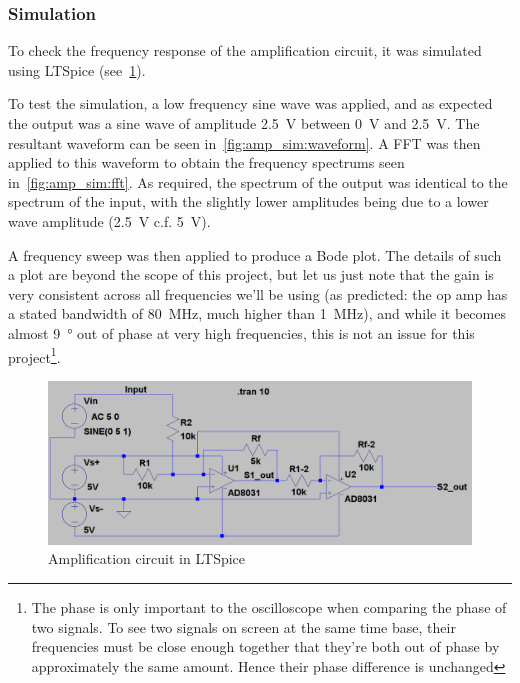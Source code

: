\subsubsection{Simulation}
To check the frequency response of the amplification circuit, it was simulated
using LTSpice (see~\cref{fig:amp_sim:circuit}).

To test the simulation, a low frequency sine wave was applied, and as expected
the output was a sine wave of amplitude \SI{2.5}{\volt} between \SI{0}{\volt}
and \SI{2.5}{\volt}. The resultant waveform can be seen
in~\cref{fig:amp_sim:waveform}. A FFT was then applied to this waveform to
obtain the frequency spectrums seen in~\cref{fig:amp_sim:fft}. As required, the
spectrum of the output was identical to the spectrum of the input, with the
slightly lower amplitudes being due to a lower wave amplitude (\SI{2.5}{\volt}
c.f. \SI{5}{\volt}).

A frequency sweep was then applied to produce a Bode plot. The details of such a
plot are beyond the scope of this project, but let us just note that the gain is
very consistent across all frequencies we'll be using (as predicted: the op amp
has a stated bandwidth of \SI{80}{\MHz}, much higher than \SI{1}{\MHz}), and
while it becomes almost \SI{9}{\degree} out of phase at very high frequencies,
this is not an issue for this project\footnote{The phase is only important to
the oscilloscope when comparing the phase of two signals. To see two signals on
screen at the same time base, their frequencies must be close enough together
that they're both out of phase by approximately the same amount. Hence their
phase difference is unchanged}.

\begin{figure}[ht]
  \includegraphics[width=\textwidth]{img/amplifier/circuit.png}
  \caption[Amplification Circuit Simulation]{Amplification circuit in LTSpice}
  \label{fig:amp_sim:circuit}
\end{figure}


